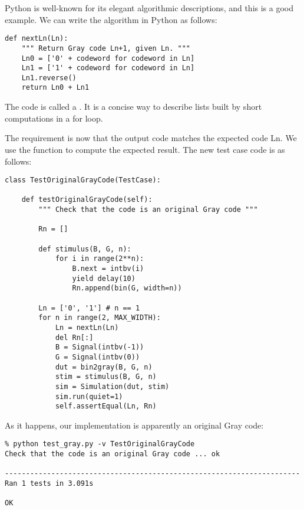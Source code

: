 Python is well-known for its elegant algorithmic
descriptions, and this is a good example. We can write the algorithm
in Python as follows:

\begin{verbatim}
def nextLn(Ln):
    """ Return Gray code Ln+1, given Ln. """
    Ln0 = ['0' + codeword for codeword in Ln]
    Ln1 = ['1' + codeword for codeword in Ln]
    Ln1.reverse()
    return Ln0 + Ln1
\end{verbatim}

The code  is called a . It is a concise way to describe lists built by short
computations in a for loop.

The requirement is now that the output code matches the
expected code Ln. We use the  function to compute the
expected result. The new test case code is as follows:

\begin{verbatim}
class TestOriginalGrayCode(TestCase):

    def testOriginalGrayCode(self):
        """ Check that the code is an original Gray code """

        Rn = []
        
        def stimulus(B, G, n):
            for i in range(2**n):
                B.next = intbv(i)
                yield delay(10)
                Rn.append(bin(G, width=n))
        
        Ln = ['0', '1'] # n == 1
        for n in range(2, MAX_WIDTH):
            Ln = nextLn(Ln)
            del Rn[:]
            B = Signal(intbv(-1))
            G = Signal(intbv(0))
            dut = bin2gray(B, G, n)
            stim = stimulus(B, G, n)
            sim = Simulation(dut, stim)
            sim.run(quiet=1)
            self.assertEqual(Ln, Rn)
\end{verbatim}

As it happens, our implementation is apparently an original Gray code:

\begin{verbatim}
% python test_gray.py -v TestOriginalGrayCode
Check that the code is an original Gray code ... ok

----------------------------------------------------------------------
Ran 1 tests in 3.091s

OK
\end{verbatim}


 

